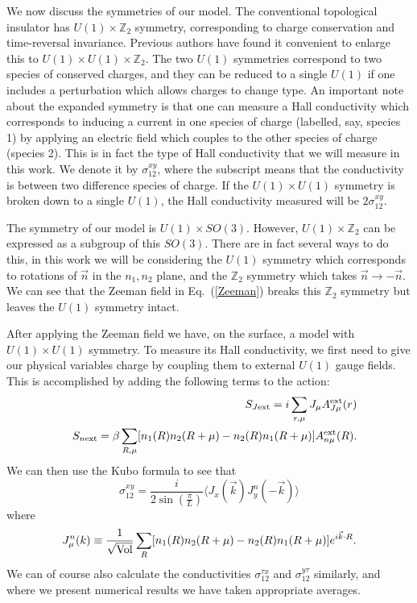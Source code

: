 \documentclass[prb,twocolumn]{revtex4}
\def\ra{\rangle} %
\def\la{\langle} %
\begin{document}
We now discuss the symmetries of our model. The conventional topological insulator has $U(1)\times \mathbb{Z}_2$ symmetry, corresponding to charge conservation and time-reversal invariance. Previous authors\cite{SenthilVishwanath,Fishertalk} have found it convenient to enlarge this to $U(1)\times U(1)\times\mathbb{Z}_2$. The two $U(1)$ symmetries correspond to two species of conserved charges, and they can be reduced to a single $U(1)$ if one includes a perturbation which allows charges to change type. An important note about the expanded symmetry is that one can measure a Hall conductivity which corresponds to inducing a current in one species of charge (labelled, say, species 1) by applying an electric field which couples to the other species of charge (species 2). This is in fact the type of Hall conductivity that we will measure in this work. We denote it by $\sigma^{xy}_{12}$, where the subscript means that the conductivity is between two difference species of charge. If the $U(1)\times U(1)$ symmetry is broken down to a single $U(1)$, the Hall conductivity measured will be $2\sigma^{xy}_{12}$. 

The symmetry of our model is $U(1)\times SO(3)$. However, $U(1)\times\mathbb{Z}_2$ can be expressed as a subgroup of this $SO(3)$. There are in fact several ways to do this, in this work we will be considering the $U(1)$ symmetry which corresponds to rotations of $\vec{n}$ in the $n_1,n_2$ plane, and the $\mathbb{Z}_2$ symmetry which takes $\vec{n}\rightarrow-\vec{n}$. We can see that the Zeeman field in Eq.~(\ref{Zeeman}) breaks this $\mathbb{Z}_2$ symmetry but leaves the $U(1)$ symmetry intact.

After applying the Zeeman field we have, on the surface, a model with $U(1)\times U(1)$ symmetry. To measure its Hall conductivity, we first need to give our physical variables charge by coupling them to external $U(1)$ gauge fields. This is accomplished by adding the following terms to the action:
\begin{eqnarray}
&&S_{J{\rm ext}}=i\sum_{r,\mu}J_\mu A_{J\mu}^{\rm ext}(r)\\
&&S_{n{\rm ext}}=\beta \sum_{R,\mu}[n_1(R)n_2(R+\mu)-n_2(R)n_1(R+\mu)]A_{n\mu}^{\rm ext}(R).
\end{eqnarray}
We can then use the Kubo formula to see that
\begin{equation}
\sigma^{xy}_{12}=\frac{i}{2\sin(\frac{\pi}{L})}\la J_x(\vec k) J^n_y(-\vec k)\ra
\label{hall}
\end{equation}
where 
\begin{equation}
J^n_\mu(k)\equiv \frac{1}{\rm \sqrt{Vol}}\sum_R [n_1(R)n_2(R+\mu)-n_2(R)n_1(R+\mu)] e^{i\vec{k}\cdot R}.
\end{equation}
We can of course also calculate the conductivities $\sigma^{\tau x}_{12}$ and $\sigma^{y\tau}_{12}$ similarly, and where we present numerical results we have taken appropriate averages.
\end{document}
